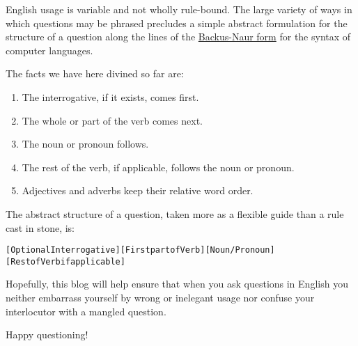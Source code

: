 \documentclass[
  12pt,
  a4paper,
]{article}
\newcommand\noun[1]{\textcolor{noun}{#1}}
\newcommand\pronoun[1]{\textcolor{pronoun}{#1}}
\newcommand\action[1]{\textcolor{action}{#1}}
\begin{document}
English usage is variable and not wholly rule-bound. The large variety
of ways in which questions may be phrased precludes a simple abstract
formulation for the structure of a question along the lines of the
\href{http://en.wikipedia.org/wiki/Backus_Naur_form}{Backus-Naur form}
for the syntax of computer languages.

The facts we have here divined so far are:

\begin{enumerate}
\item
  The interrogative, if it exists, comes first.
\item
  The whole or part of the verb comes next.
\item
  The noun or pronoun follows.
\item
  The rest of the verb, if applicable, follows the noun or pronoun.
\item
  Adjectives and adverbs keep their relative word order.
\end{enumerate}

The abstract structure of a question, taken more as a flexible guide
than a rule cast in stone, is:

\begin{tcolorbox}
\begin{alltt}
\color{normal}
[Optional Interrogative] [\action{First part of Verb}] [\noun{Noun}/\pronoun{Pronoun}] [\action{Rest of \newline Verb if applicable}]
\end{alltt}
\end{tcolorbox}

Hopefully, this blog will help ensure that when you ask questions in
English you neither embarrass yourself by wrong or inelegant usage nor
confuse your interlocutor with a mangled question.

Happy questioning!  \normalfont
\end{document}
